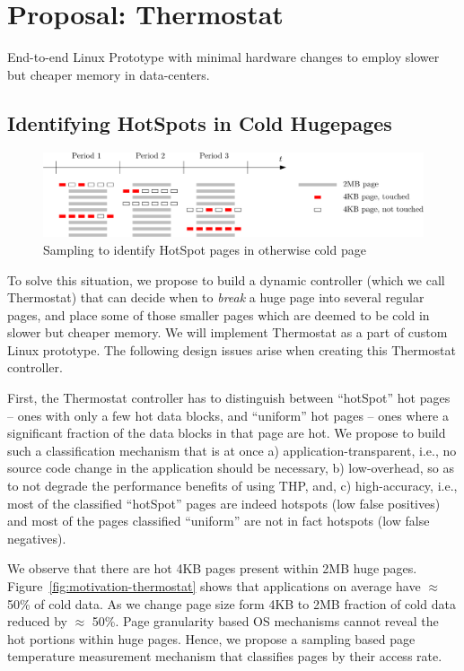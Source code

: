 \section{Proposal: Thermostat}
\label{proposal}

End-to-end Linux Prototype with minimal hardware changes to employ
slower but cheaper memory in data-centers.

\subsection{Identifying HotSpots in Cold Hugepages}

\begin{figure}[t]
\centering
\includegraphics[width=1.0\columnwidth]{thermostat/figures/sampling.png}
\caption{Sampling to identify HotSpot pages in otherwise cold page}
\vspace{-0.175in}
\label{fig:sampling}
\end{figure}
To solve this situation, we propose to build a dynamic controller (which we call
Thermostat) that can decide when to {\it break} a huge page into several regular
pages, and place some of those smaller pages which are deemed to be cold in
slower but cheaper memory. We will implement Thermostat as a part of custom
Linux prototype. The following design issues arise when creating this Thermostat
controller.

First, the Thermostat controller has to distinguish between ``hotSpot'' hot pages -- ones
with only a few hot data blocks, and ``uniform'' hot pages -- ones where a
significant fraction of the data blocks in that page are hot.  We propose to
build such a classification mechanism that is at once a)
application-transparent, i.e., no source code change in the application should
be necessary, b) low-overhead, so as to not degrade the performance benefits of
using THP, and, c) high-accuracy, i.e., most of the classified ``hotSpot'' pages
are indeed hotspots (low false positives) and most of the pages classified
``uniform'' are {\it} not in fact hotspots (low false negatives).

We observe that there are hot 4KB pages present within 2MB huge pages.
Figure~\ref{fig:motivation-thermostat}
shows that applications on average have $\approx$ 50\% of cold data. As we change page size
form 4KB to 2MB fraction of cold data reduced by $\approx$ 50\%. Page granularity based
OS mechanisms cannot reveal the hot portions within huge pages. Hence, we
propose a sampling based page temperature measurement mechanism that classifies
pages by their access rate.

